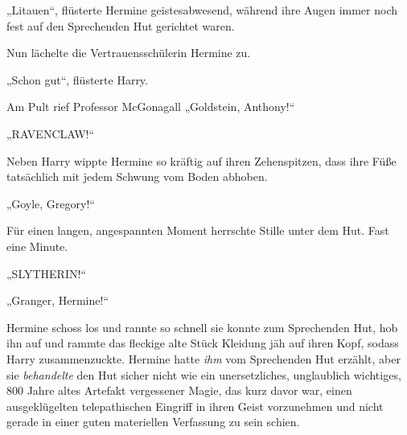



„Litauen“, flüsterte Hermine geistesabwesend, während ihre Augen immer noch fest auf den Sprechenden Hut gerichtet waren.

Nun lächelte die Vertrauensschülerin Hermine zu.

„Schon gut“, flüsterte Harry.

Am Pult rief Professor McGonagall
„Goldstein, Anthony!“

„RAVENCLAW!“

Neben Harry wippte Hermine so kräftig auf ihren Zehenspitzen, dass ihre Füße tatsächlich mit jedem Schwung vom Boden abhoben.

„Goyle, Gregory!“

Für einen langen, angespannten Moment herrschte Stille unter dem Hut. Fast eine Minute.

„SLYTHERIN!“

„Granger, Hermine!“

Hermine schoss los und rannte so schnell sie konnte zum Sprechenden Hut, hob ihn auf und rammte das fleckige alte Stück Kleidung jäh auf ihren Kopf, sodass Harry zusammenzuckte. Hermine hatte \emph{ihm} vom Sprechenden Hut erzählt, aber sie \emph{behandelte} den Hut sicher nicht wie ein unersetzliches, unglaublich wichtiges, 800 Jahre altes Artefakt vergessener Magie, das kurz davor war, einen ausgeklügelten telepathischen Eingriff in ihren Geist vorzunehmen und nicht gerade in einer guten materiellen Verfassung zu sein schien.

